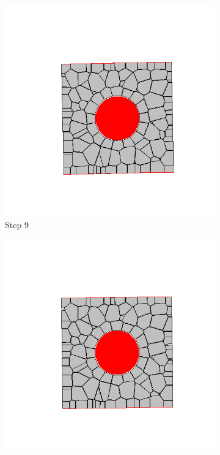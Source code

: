 \begin{figure}[ht!]
      \begin{subfigure}{.25\textwidth}
        \centering
        \includegraphics[width=1.0\linewidth]{Files/Small_DEF/CR/DEP5-STEP(009).png}
      \caption{Step 9}
      \end{subfigure}%
      \begin{subfigure}{.25\textwidth}
        \centering
        \includegraphics[width=1.0\linewidth]{Files/Small_DEF/CR/DEP5-STEP(010).png}

\end{subfigure}
\end{figure}
